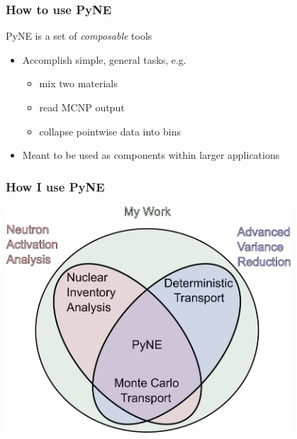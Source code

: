 \documentclass[12pt]{beamer}
\begin{document}
\begin{frame}[fragile]
\frametitle{How to use PyNE}

PyNE is a set of \emph{composable} tools
\begin{itemize}
\item Accomplish simple, general tasks, e.g.
\begin{itemize}
\item mix two materials
\item read MCNP output
\item collapse pointwise data into bins
\end{itemize}
\item Meant to be used as components within larger applications
\end{itemize}

\end{frame}
\begin{frame}[fragile]
\frametitle{How I use PyNE}
\centerline{\includegraphics[width=0.8\textwidth]{coupling.pdf}}
\end{frame}
%
%        
%        

\end{document}
